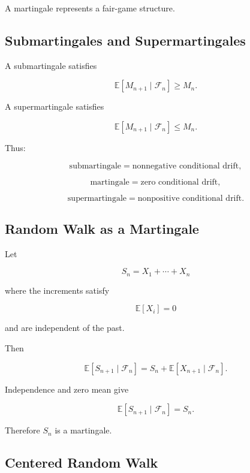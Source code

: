 A martingale represents a fair-game structure.

\subsection{Submartingales and Supermartingales}
\label{subsec:sub-super-martingales}

A submartingale satisfies

\[
\boxed{
\mathbb{E}
[
M_{n+1}
\mid
\mathcal{F}_n
]
\geq
M_n.
}
\]

A supermartingale satisfies

\[
\boxed{
\mathbb{E}
[
M_{n+1}
\mid
\mathcal{F}_n
]
\leq
M_n.
}
\]

Thus:

\[
\boxed{
\text{submartingale}
=
\text{nonnegative conditional drift},
}
\]

\[
\boxed{
\text{martingale}
=
\text{zero conditional drift},
}
\]

\[
\boxed{
\text{supermartingale}
=
\text{nonpositive conditional drift}.
}
\]

\subsection{Random Walk as a Martingale}
\label{subsec:random-walk-martingale}

Let

\[
S_n
=
X_1+\cdots+X_n
\]

where the increments satisfy

\[
\mathbb{E}[X_i]=0
\]

and are independent of the past.

Then

\[
\mathbb{E}[S_{n+1}\mid\mathcal{F}_n]
=
S_n
+
\mathbb{E}[X_{n+1}\mid\mathcal{F}_n].
\]

Independence and zero mean give

\[
\boxed{
\mathbb{E}[S_{n+1}\mid\mathcal{F}_n]
=
S_n.
}
\]

Therefore \(S_n\) is a martingale.

\subsection{Centered Random Walk}
\label{subsec:centered-random-walk-martingale}

